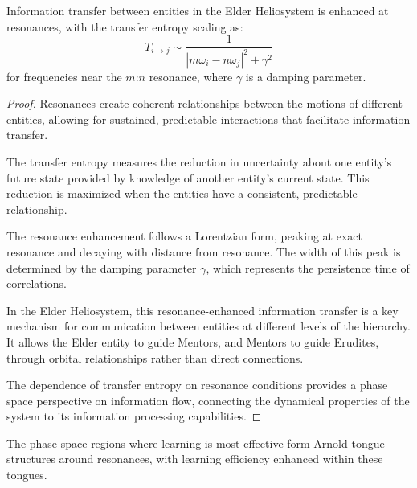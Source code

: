 \begin{theorem}
Information transfer between entities in the Elder Heliosystem is enhanced at resonances, with the transfer entropy scaling as:
\begin{equation}
T_{i \to j} \sim \frac{1}{|m\omega_i - n\omega_j|^2 + \gamma^2}
\end{equation}
for frequencies near the $m$:$n$ resonance, where $\gamma$ is a damping parameter.
\end{theorem}

\begin{proof}
Resonances create coherent relationships between the motions of different entities, allowing for sustained, predictable interactions that facilitate information transfer.

The transfer entropy measures the reduction in uncertainty about one entity's future state provided by knowledge of another entity's current state. This reduction is maximized when the entities have a consistent, predictable relationship.

The resonance enhancement follows a Lorentzian form, peaking at exact resonance and decaying with distance from resonance. The width of this peak is determined by the damping parameter $\gamma$, which represents the persistence time of correlations.

In the Elder Heliosystem, this resonance-enhanced information transfer is a key mechanism for communication between entities at different levels of the hierarchy. It allows the Elder entity to guide Mentors, and Mentors to guide Erudites, through orbital relationships rather than direct connections.

The dependence of transfer entropy on resonance conditions provides a phase space perspective on information flow, connecting the dynamical properties of the system to its information processing capabilities.
\end{proof}

\begin{theorem}
The phase space regions where learning is most effective form Arnold tongue structures around resonances, with learning efficiency enhanced within these tongues.
\end{theorem}

